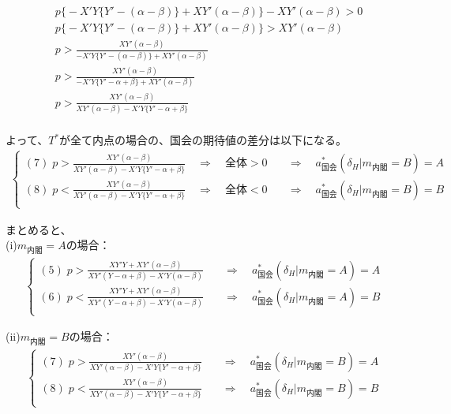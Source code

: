 \documentclass[main.tex]{subfiles}
\begin{document}
\begin{align*}
    & p \Big\{  -X'Y\{ Y' - (\alpha-\beta)  \} +XY'(\alpha-\beta) \Big\} - XY'(\alpha-\beta)>0\\[1em]
    & p \Big\{  -X'Y\{ Y' - (\alpha-\beta)  \} +XY'(\alpha-\beta) \Big\}  >  XY'(\alpha-\beta)\\[1em]
    & p >  \frac{ XY'(\alpha-\beta) }{ -X'Y\{ Y' - (\alpha-\beta)  \} +XY'(\alpha-\beta) }\\[1em]
    & p >  \frac{ XY'(\alpha-\beta) }{ -X'Y\{ Y' - \alpha+ \beta  \} +XY'(\alpha-\beta) }\\[1em]
    & p >  \frac{ XY'(\alpha-\beta) }{ XY'(\alpha-\beta) -X'Y\{ Y' - \alpha+ \beta  \} }\\[1em]
\end{align*}


よって、$T^*$が全て内点の場合の、国会の期待値の差分は以下になる。
\begin{align*}
    \begin{cases}
        (7)\;  p >  \frac{ XY'(\alpha-\beta) }{ XY'(\alpha-\beta) -X'Y\{ Y' - \alpha+ \beta  \} } \quad\Rightarrow\quad 全体>0 &\quad\Rightarrow\quad a^*_{国会}(\delta_H|m_{内閣} = B) = A\\[0.5em]
        (8)\;  p <  \frac{ XY'(\alpha-\beta) }{ XY'(\alpha-\beta) -X'Y\{ Y' - \alpha+ \beta  \} } \quad\Rightarrow\quad 全体<0 &\quad\Rightarrow\quad a^*_{国会}(\delta_H|m_{内閣} = B) = B\\[0.5em] 
     \end{cases}
\end{align*}


\bigskip
まとめると、\\
\noindent
(i)$m_{内閣}=A$の場合：
\begin{align*}
    \begin{cases}
        (5)\; p  > \frac{XY'Y + XY'(\alpha - \beta)}{XY' (Y -\alpha + \beta)  - X'Y(\alpha - \beta) }   &\quad\Rightarrow\quad a^*_{国会}(\delta_H|m_{内閣} = A) = A\\[0.5em]
        (6)\; p  < \frac{XY'Y + XY'(\alpha - \beta)}{XY' (Y -\alpha + \beta)  - X'Y(\alpha - \beta) } &\quad\Rightarrow\quad a^*_{国会}(\delta_H|m_{内閣} = A) = B\\[0.5em] 
     \end{cases}
\end{align*}

\noindent
(ii)$m_{内閣}=B$の場合：
\begin{align*}
    \begin{cases}
        (7)\;  p >  \frac{ XY'(\alpha-\beta) }{ XY'(\alpha-\beta) -X'Y\{ Y' - \alpha+ \beta  \} }  &\quad\Rightarrow\quad a^*_{国会}(\delta_H|m_{内閣} = B) = A\\[0.5em]
        (8)\;  p <  \frac{ XY'(\alpha-\beta) }{ XY'(\alpha-\beta) -X'Y\{ Y' - \alpha+ \beta  \} } &\quad\Rightarrow\quad a^*_{国会}(\delta_H|m_{内閣} = B) = B\\[0.5em] 
     \end{cases}
\end{align*}
\end{document}
